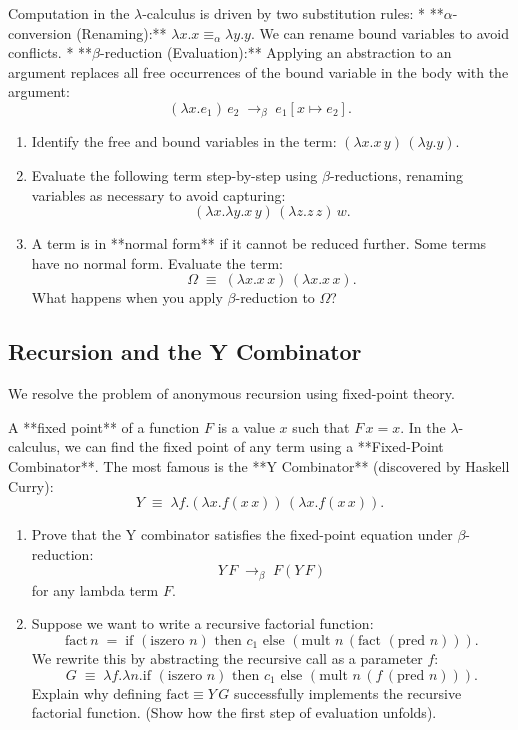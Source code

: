 \documentclass[12pt, a4paper]{book}
\begin{document}
\begin{explobox}
Computation in the $\lambda$-calculus is driven by two substitution rules:
* **$\alpha$-conversion (Renaming):** $\lambda x. x \equiv_\alpha \lambda y. y$. We can rename bound variables to avoid conflicts.
* **$\beta$-reduction (Evaluation):** Applying an abstraction to an argument replaces all free occurrences of the bound variable in the body with the argument:
  \[
    (\lambda x. e_1) \, e_2 \;\to_\beta\; e_1[x \mapsto e_2].
  \]
\begin{enumerate}[label=(\alph*), leftmargin=*]
  \item Identify the free and bound variables in the term: $(\lambda x. x \, y) \, (\lambda y. y)$.
  \item Evaluate the following term step-by-step using $\beta$-reductions, renaming variables as necessary to avoid capturing:
        \[
          (\lambda x. \lambda y. x \, y) \, (\lambda z. z \, z) \, w.
        \]
  \item A term is in **normal form** if it cannot be reduced further.
        Some terms have no normal form. Evaluate the term:
        \[
          \Omega \;\equiv\; (\lambda x. x \, x) \, (\lambda x. x \, x).
        \]
        What happens when you apply $\beta$-reduction to $\Omega$?
\end{enumerate}
\end{explobox}

\subsection{Recursion and the Y Combinator}

We resolve the problem of anonymous recursion using fixed-point theory.

\begin{explobox}
A **fixed point** of a function $F$ is a value $x$ such that $F \, x = x$.
In the $\lambda$-calculus, we can find the fixed point of any term using a **Fixed-Point Combinator**. The most famous is the **Y Combinator** (discovered by Haskell Curry):
\[
  Y \;\equiv\; \lambda f. (\lambda x. f (x \, x)) \, (\lambda x. f (x \, x)).
\]
\begin{enumerate}[label=(\alph*), leftmargin=*]
  \item Prove that the Y combinator satisfies the fixed-point equation under $\beta$-reduction:
        \[
          Y \, F \;\to_\beta\; F(Y \, F)
        \]
        for any lambda term $F$.
  \item Suppose we want to write a recursive factorial function:
        \[
          \text{fact} \, n \;=\; \text{if } (\text{iszero } n) \text{ then } c_1 \text{ else } (\text{mult } n \, (\text{fact } (\text{pred } n))).
        \]
        We rewrite this by abstracting the recursive call as a parameter $f$:
        \[
          G \;\equiv\; \lambda f. \lambda n. \text{if } (\text{iszero } n) \text{ then } c_1 \text{ else } (\text{mult } n \, (f \, (\text{pred } n))).
        \]
        Explain why defining $\text{fact} \equiv Y \, G$ successfully implements the recursive factorial function. (Show how the first step of evaluation unfolds).
\end{enumerate}
\end{explobox}
\end{document}
